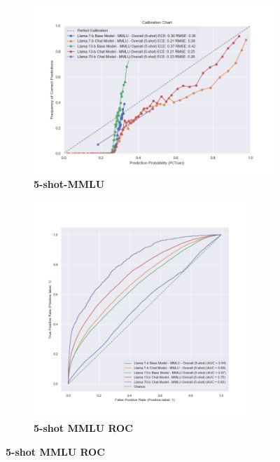 \documentclass[11pt]{article}
\begin{document}
\begin{figure}
\begin{subfigure}[b]{0.38\textwidth}
    \end{subfigure}  
     \hfill
     \begin{subfigure}[b]{0.60\textwidth}
         \centering
         \includegraphics[width=1.1\textwidth]{figures/5-shot-MMLU.png}
         \caption{\textbf{5-shot-MMLU} }
         \label{fig:5-shot-logicqa}
     \end{subfigure}     
     \begin{subfigure}[b]{0.38\textwidth}
         \centering 
         \includegraphics[width=0.9\textwidth]{figures/5-shot-MMLU-roc.png}
         \caption{\textbf{5-shot MMLU ROC} }
         \label{fig:5-shot-MMLU-roc}
    \end{subfigure} 
    

\end{figure}
\end{document}
